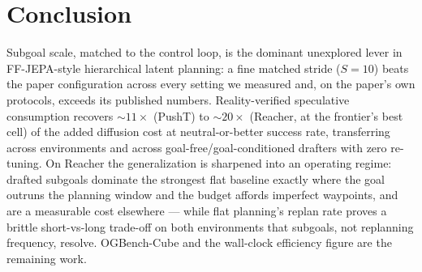 \documentclass{article}
\begin{document}
\section{Conclusion}
\label{sec:conclusion}
Subgoal scale, matched to the control loop, is the dominant unexplored lever in FF-JEPA-style
hierarchical latent planning: a fine matched stride ($S{=}10$) beats the paper configuration
across every setting we measured and, on the paper's own protocols, exceeds its published
numbers. Reality-verified speculative consumption recovers ${\sim}11\times$
(PushT) to ${\sim}20\times$ (Reacher, at the frontier's best cell) of the added
diffusion cost at neutral-or-better success rate, transferring across environments and
across goal-free/goal-conditioned drafters with zero re-tuning. On Reacher the
generalization is sharpened into an operating regime: drafted subgoals dominate the
strongest flat baseline exactly where the goal outruns the planning window and the
budget affords imperfect waypoints, and are a measurable cost elsewhere --- while flat
planning's replan rate proves a brittle short-vs-long trade-off on both environments
that subgoals, not replanning frequency, resolve. OGBench-Cube and the wall-clock
efficiency figure are the remaining work.




\end{document}
